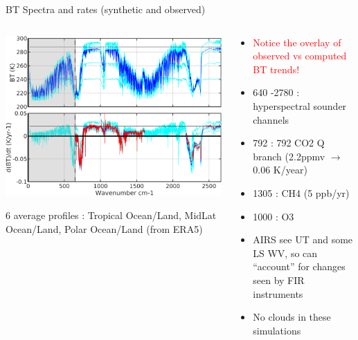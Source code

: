 \documentclass[10pt,t]{beamer}
\begin{document}

\begin{frame}{BT Spectra and rates (synthetic and observed)}

\vspace{-0.1in}
\begin{columns}

\begin{column}{0.55\columnwidth}
\begin{center}
\includegraphics[width=0.9\linewidth]{NEWFIGS/kcarta_0_3000__bttrends.png}
\end{center}
6 average profiles : Tropical Ocean/Land, MidLat Ocean/Land, Polar Ocean/Land (from ERA5)
\end{column}

\begin{column}{0.55\columnwidth}
\begin{itemize}
  \item \textcolor{red}{Notice the overlay of observed vs computed BT trends!}
  \item 640 -2780 \wn : hyperspectral sounder channels
  \item 792 \wn : 792 CO2 Q branch (2.2ppmv $\rightarrow$ 0.06 K/year)
  \item 1305 \wn : CH4 (5 ppb/yr)
  \item 1000 \wn : O3
  \item AIRS see UT and some LS WV, so can ``account'' for changes seen by FIR instruments
  \item No clouds in these simulations
\end{itemize}
\end{column}
\end{columns}
\end{frame}
\end{document}
